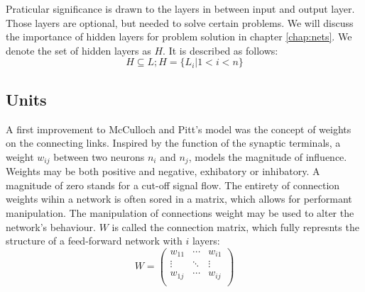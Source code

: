 \documentclass[10pt,a4paper,DIV=11]{scrreprt}
\begin{document}
\begin{figure}[H]
\label{fig:layer}
\end{figure}

Praticular significance is drawn to the layers in between input and output layer. Those layers are optional, but needed to solve certain problems. We will discuss the importance of hidden layers for problem solution in chapter \ref{chap:nets}. We denote the set of hidden layers as $H$. It is described as follows:
\begin{equation}
H \subseteq L; H = \{L_i|1<i<n\}
\end{equation}

\subsection{Units}

A first improvement to McCulloch and Pitt's model was the concept of weights on the connecting links. Inspired by the function of the synaptic terminals, a weight $w_{ij}$ between two neurons $n_i$ and $n_j$, models the magnitude of influence. Weights may be both positive and negative, exhibatory or inhibatory. A magnitude of zero stands for a cut-off signal flow. The entirety of connection weights wihin a network is often sored in a matrix, which allows for performant manipulation. The manipulation of connections weight may be used to alter the network's behaviour. $W$ is called the connection matrix, which fully represnts the structure of a feed-forward network with $i$ layers:
\begin{equation}
W = 
\begin{pmatrix}
w_{11} & \cdots & w_{i1} \\
\vdots & \ddots & \vdots \\
w_{1j} & \cdots & w_{ij} \\
\end{pmatrix}
\end{equation}
\end{document}
